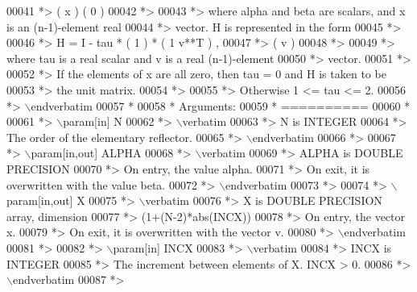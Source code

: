 \begin{DoxyCode}
00041 \textcolor{comment}{*>           (   x   )   (   0  )}
00042 \textcolor{comment}{*>}
00043 \textcolor{comment}{*> where alpha and beta are scalars, and x is an (n-1)-element real}
00044 \textcolor{comment}{*> vector. H is represented in the form}
00045 \textcolor{comment}{*>}
00046 \textcolor{comment}{*>       H = I - tau * ( 1 ) * ( 1 v**T ) ,}
00047 \textcolor{comment}{*>                     ( v )}
00048 \textcolor{comment}{*>}
00049 \textcolor{comment}{*> where tau is a real scalar and v is a real (n-1)-element}
00050 \textcolor{comment}{*> vector.}
00051 \textcolor{comment}{*>}
00052 \textcolor{comment}{*> If the elements of x are all zero, then tau = 0 and H is taken to be}
00053 \textcolor{comment}{*> the unit matrix.}
00054 \textcolor{comment}{*>}
00055 \textcolor{comment}{*> Otherwise  1 <= tau <= 2.}
00056 \textcolor{comment}{*> \(\backslash\)endverbatim}
00057 \textcolor{comment}{*}
00058 \textcolor{comment}{*  Arguments:}
00059 \textcolor{comment}{*  ==========}
00060 \textcolor{comment}{*}
00061 \textcolor{comment}{*> \(\backslash\)param[in] N}
00062 \textcolor{comment}{*> \(\backslash\)verbatim}
00063 \textcolor{comment}{*>          N is INTEGER}
00064 \textcolor{comment}{*>          The order of the elementary reflector.}
00065 \textcolor{comment}{*> \(\backslash\)endverbatim}
00066 \textcolor{comment}{*>}
00067 \textcolor{comment}{*> \(\backslash\)param[in,out] ALPHA}
00068 \textcolor{comment}{*> \(\backslash\)verbatim}
00069 \textcolor{comment}{*>          ALPHA is DOUBLE PRECISION}
00070 \textcolor{comment}{*>          On entry, the value alpha.}
00071 \textcolor{comment}{*>          On exit, it is overwritten with the value beta.}
00072 \textcolor{comment}{*> \(\backslash\)endverbatim}
00073 \textcolor{comment}{*>}
00074 \textcolor{comment}{*> \(\backslash\)param[in,out] X}
00075 \textcolor{comment}{*> \(\backslash\)verbatim}
00076 \textcolor{comment}{*>          X is DOUBLE PRECISION array, dimension}
00077 \textcolor{comment}{*>                         (1+(N-2)*abs(INCX))}
00078 \textcolor{comment}{*>          On entry, the vector x.}
00079 \textcolor{comment}{*>          On exit, it is overwritten with the vector v.}
00080 \textcolor{comment}{*> \(\backslash\)endverbatim}
00081 \textcolor{comment}{*>}
00082 \textcolor{comment}{*> \(\backslash\)param[in] INCX}
00083 \textcolor{comment}{*> \(\backslash\)verbatim}
00084 \textcolor{comment}{*>          INCX is INTEGER}
00085 \textcolor{comment}{*>          The increment between elements of X. INCX > 0.}
00086 \textcolor{comment}{*> \(\backslash\)endverbatim}
00087 \textcolor{comment}{*>}

\end{DoxyCode}
